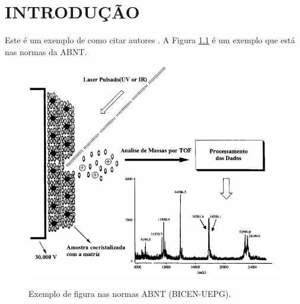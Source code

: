 \chapter{INTRODUÇÃO}

Este é um exemplo de como citar autores
\cite{gibas2001developing}. A Figura \ref{fig:exemplo} é um exemplo que está nas normas da  ABNT.


\begin{figure}[!ht]
\caption{Exemplo de figura nas normas ABNT (BICEN-UEPG).}
\includegraphics[width=1\textwidth]{imagens/figura1.PNG}
\label{fig:exemplo}
\end{figure}